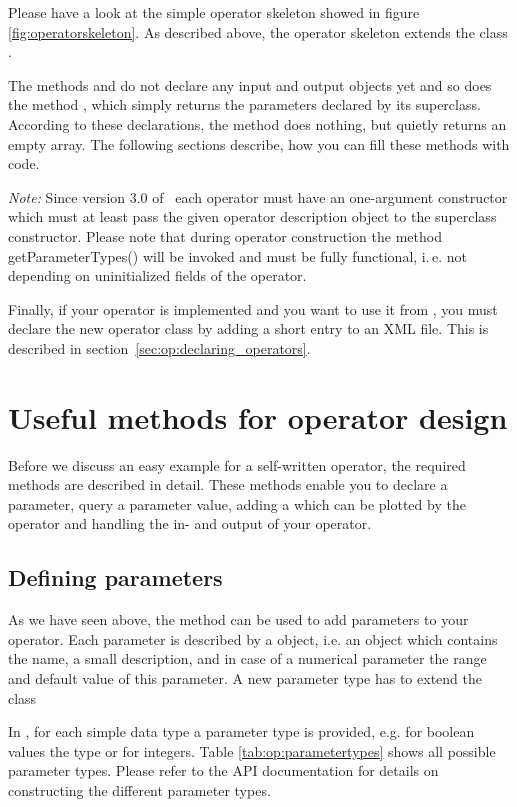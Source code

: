 Please have a look at the simple operator skeleton
showed in figure \ref{fig:operatorskeleton}. As described above, the operator
skeleton extends the class .


The methods  and  do
not declare any input and output objects yet and so does the method
, which simply returns the parameters
declared by its superclass. According to these declarations, the
 method does nothing, but quietly returns an empty
array. The following sections describe, how you can fill these methods
with code.

\textit{Note:} Since version 3.0 of \rapidminer\ each operator must have an
one-argument constructor which must at least pass the given operator
description object to the superclass constructor. Please note that
during operator construction the method getParameterTypes() will be
invoked and must be fully functional, i.\,e. not depending on uninitialized
fields of the operator.

Finally, if your operator is implemented and you want to use it from
\rapidminer, you must declare the new operator class by adding a short entry
to an XML file. This is described in
section~\ref{sec:op:declaring_operators}.




\section{Useful methods for operator design}

Before we discuss an easy example for a self-written operator, the required methods are
described in detail. These methods enable you to declare a parameter, query a
parameter value, adding a  which can be plotted by the
 operator and handling the in- and output of your operator.



\subsection{Defining parameters}
\label{sec:op:adding_parameters}

As we have seen above, the method  can be used to
add parameters to your operator. Each parameter is described by a
 object, i.e. an object which contains the name, a small
description, and in case of a numerical parameter the range and default
value of this parameter. A new parameter type has to extend the class
\begin{center}
\end{center} 
In \rapidminer, for each simple data type a parameter type is
provided, e.g. for boolean values the type  or
 for integers.
Table \ref{tab:op:parametertypes} shows all possible parameter types. Please
refer to the API documentation for details on constructing the different
parameter types.

